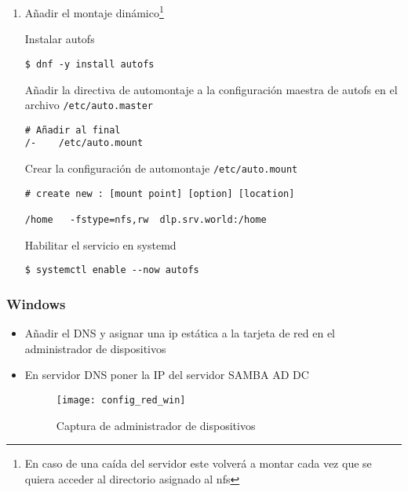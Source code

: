 \documentclass[../main.tex]{subfiles}
\begin{document}
\begin{enumerate}
  \item Añadir el montaje dinámico\footnote{En caso de una caída
        del servidor este volverá a montar cada vez que se
        quiera acceder al directorio asignado al \Gls{nfs}}

        Instalar \Gls{autofs}
        \begin{listing}[H]
\begin{verbatim}
$ dnf -y install autofs
\end{verbatim}
        \end{listing}
        Añadir la directiva de automontaje a la configuración maestra de
        \gls{autofs} en el archivo \texttt{/etc/auto.master}

        \begin{listing}[H]
\begin{verbatim}
# Añadir al final
/-    /etc/auto.mount
\end{verbatim}
        \end{listing}

        Crear la configuración de automontaje \texttt{/etc/auto.mount}
        \begin{listing}[H]
\begin{verbatim}
# create new : [mount point] [option] [location]

/home   -fstype=nfs,rw  dlp.srv.world:/home
\end{verbatim}
        \end{listing}

        Habilitar el servicio en \gls{systemd}
        \begin{listing}[H]
\begin{verbatim}
$ systemctl enable --now autofs
\end{verbatim}
        \end{listing}

\end{enumerate}


\newpage{}



\subsubsection{Windows}\label{sec:cliente_win}

\begin{itemize}
  \item Añadir el DNS y asignar una ip estática a la tarjeta de red en el administrador de dispositivos
  \item En servidor DNS poner la IP del servidor SAMBA AD DC
        \begin{figure}[H]
          \centering
          \texttt{[image: config\_red\_win]}
          \caption{Captura de administrador de dispositivos}\label{fig:confrwin}
        \end{figure}

\end{itemize}
\end{document}
